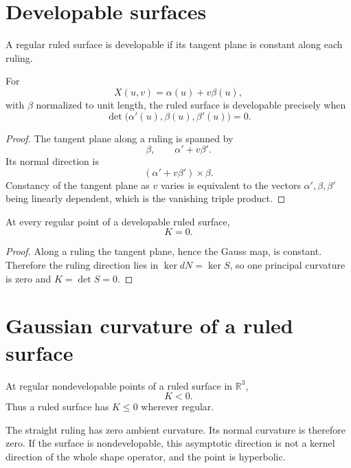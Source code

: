 \section{Developable surfaces}

\begin{definition}\label{def:vii18-developable}
A regular ruled surface is developable if its tangent plane is constant along each ruling.
\end{definition}

\begin{theorem}\label{thm:vii18-triple}
For
\[
X(u,v)=\alpha(u)+v\beta(u),
\]
with \(\beta\) normalized to unit length, the ruled surface is developable precisely when
\[
\det\bigl(\alpha'(u),\beta(u),\beta'(u)\bigr)=0.
\]
\end{theorem}

\begin{proof}
The tangent plane along a ruling is spanned by
\[
\beta,\qquad \alpha'+v\beta'.
\]
Its normal direction is
\[
(\alpha'+v\beta')\times\beta.
\]
Constancy of the tangent plane as \(v\) varies is equivalent to the vectors
\(\alpha',\beta,\beta'\) being linearly dependent, which is the vanishing triple product.
\end{proof}

\begin{theorem}\label{thm:vii18-kzero}
At every regular point of a developable ruled surface,
\[
K=0.
\]
\end{theorem}

\begin{proof}
Along a ruling the tangent plane, hence the Gauss map, is constant. Therefore the ruling direction lies in \(\ker dN=\ker S\), so one principal curvature is zero and \(K=\det S=0\).
\end{proof}

\section{Gaussian curvature of a ruled surface}

\begin{proposition}\label{prop:vii18-k-nonpositive}
At regular nondevelopable points of a ruled surface in \(\mathbb R^3\),
\[
K<0.
\]
Thus a ruled surface has \(K\le0\) wherever regular.
\end{proposition}

\begin{remark}
The straight ruling has zero ambient curvature. Its normal curvature is therefore zero. If the surface is nondevelopable, this asymptotic direction is not a kernel direction of the whole shape operator, and the point is hyperbolic.
\end{remark}

